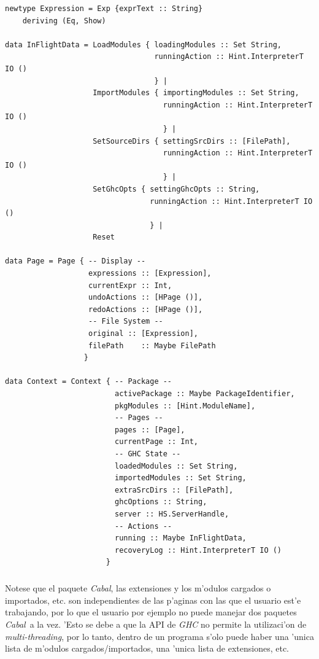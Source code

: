 \documentclass[a4paper]{article}
\newcommand{\cabal}{\textsl{Cabal}}
\begin{document}
\begin{center}\begin{lstlisting}
newtype Expression = Exp {exprText :: String}       
    deriving (Eq, Show)

data InFlightData = LoadModules { loadingModules :: Set String,
                                  runningAction :: Hint.InterpreterT IO ()
                                  } |
                    ImportModules { importingModules :: Set String,
                                    runningAction :: Hint.InterpreterT IO ()
                                    } | 
                    SetSourceDirs { settingSrcDirs :: [FilePath],
                                    runningAction :: Hint.InterpreterT IO ()
                                    } |
                    SetGhcOpts { settingGhcOpts :: String,
                                 runningAction :: Hint.InterpreterT IO ()
                                 } |
                    Reset

data Page = Page { -- Display --
                   expressions :: [Expression],
                   currentExpr :: Int,
                   undoActions :: [HPage ()],
                   redoActions :: [HPage ()],
                   -- File System --
                   original :: [Expression],
                   filePath    :: Maybe FilePath
                  }
                  
data Context = Context { -- Package --
                         activePackage :: Maybe PackageIdentifier,
                         pkgModules :: [Hint.ModuleName],
                         -- Pages --
                         pages :: [Page],
                         currentPage :: Int,
                         -- GHC State --
                         loadedModules :: Set String,
                         importedModules :: Set String,
                         extraSrcDirs :: [FilePath],
                         ghcOptions :: String,
                         server :: HS.ServerHandle,
                         -- Actions --
                         running :: Maybe InFlightData,
                         recoveryLog :: Hint.InterpreterT IO ()
                       }
\end{lstlisting}\end{center}
\subparagraph{}Notese que el paquete \cabal, las extensiones y los m'odulos cargados o importados, etc. son independientes de las p'aginas con las que el usuario est'e trabajando, por lo que el usuario por ejemplo no puede manejar dos paquetes \cabal\ a la vez.  'Esto se debe a que la API de \textsl{GHC} no permite la utilizaci'on de \textsl{multi-threading}, por lo tanto, dentro de un programa s'olo puede haber una 'unica lista de m'odulos cargados/importados, una 'unica lista de extensiones, etc.
\end{document}
